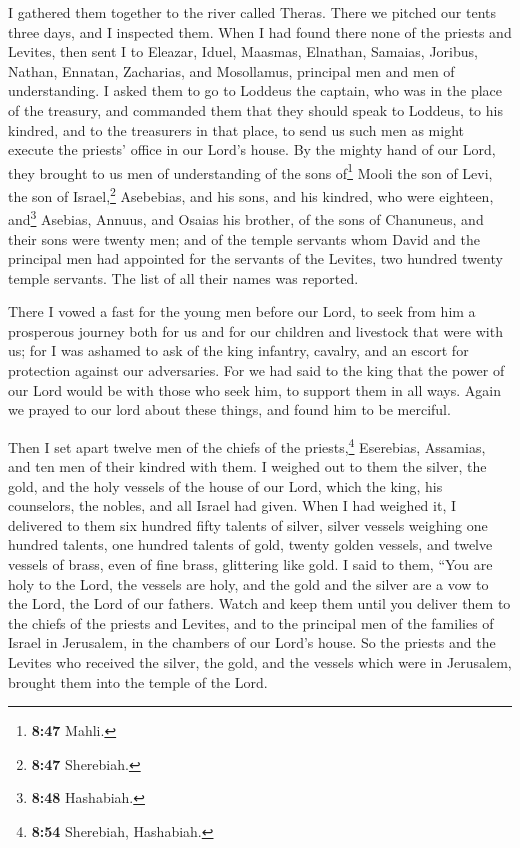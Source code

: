  I gathered them together to the river called Theras.
There we pitched our tents three days, and I inspected them.
 When I had found there none of the priests and Levites,
 then sent I to Eleazar, Iduel, Maasmas, 
Elnathan, Samaias, Joribus, Nathan, Ennatan, Zacharias, and Mosollamus,
principal men and men of understanding.  I asked them to
go to Loddeus the captain, who was in the place of the treasury,
 and commanded them that they should speak to Loddeus, to
his kindred, and to the treasurers in that place, to send us such men as
might execute the priests' office in our Lord's house. 
By the mighty hand of our Lord, they brought to us men of understanding
of the sons of\footnote{\textbf{8:47} Mahli.} Mooli the son of Levi, the
son of Israel,\footnote{\textbf{8:47} Sherebiah.} Asebebias, and his
sons, and his kindred, who were eighteen,  and\footnote{\textbf{8:48}
  Hashabiah.} Asebias, Annuus, and Osaias his brother, of the sons of
Chanuneus, and their sons were twenty men;  and of the
temple servants whom David and the principal men had appointed for the
servants of the Levites, two hundred twenty temple servants. The list of
all their names was reported.

 There I vowed a fast for the young men before our Lord,
to seek from him a prosperous journey both for us and for our children
and livestock that were with us;  for I was ashamed to
ask of the king infantry, cavalry, and an escort for protection against
our adversaries.  For we had said to the king that the
power of our Lord would be with those who seek him, to support them in
all ways.  Again we prayed to our lord about these
things, and found him to be merciful.

 Then I set apart twelve men of the chiefs of the
priests,\footnote{\textbf{8:54} Sherebiah, Hashabiah.} Eserebias,
Assamias, and ten men of their kindred with them.  I
weighed out to them the silver, the gold, and the holy vessels of the
house of our Lord, which the king, his counselors, the nobles, and all
Israel had given.  When I had weighed it, I delivered to
them six hundred fifty talents of silver, silver vessels weighing one
hundred talents, one hundred talents of gold,  twenty
golden vessels, and twelve vessels of brass, even of fine brass,
glittering like gold.  I said to them, ``You are holy to
the Lord, the vessels are holy, and the gold and the silver are a vow to
the Lord, the Lord of our fathers.  Watch and keep them
until you deliver them to the chiefs of the priests and Levites, and to
the principal men of the families of Israel in Jerusalem, in the
chambers of our Lord's house.  So the priests and the
Levites who received the silver, the gold, and the vessels which were in
Jerusalem, brought them into the temple of the Lord.

